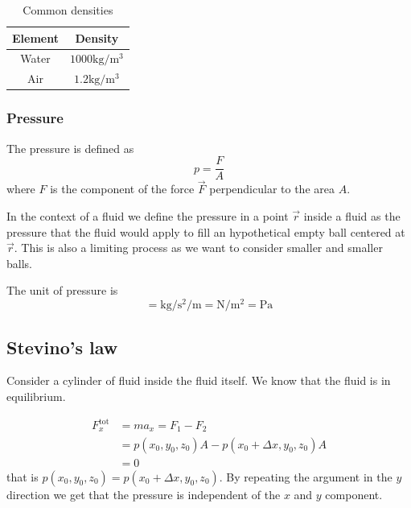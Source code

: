\documentclass[12pt]{extarticle}
\begin{document}
\begin{table}[H]
    \centering
    \begin{tabular}{|c|c|}
        \hline
        \textbf{Element} & \textbf{Density}                         \\
        \hline
        Water            & $1000 \si{\kilogram \per \meter \cubed}$ \\
        Air              & $1.2 \si{\kilogram \per \meter \cubed}$  \\
        \hline
    \end{tabular}
    \caption{Common densities}
\end{table}

\subsubsection{Pressure}

The pressure is defined as
\begin{equation}
    p = \frac{F}{A}
\end{equation}
where $F$ is the component of the force $\vec{F}$ perpendicular to the area $A$.

In the context of a fluid we define the pressure in a point $\vec r$ inside a fluid as the pressure that the fluid would apply to fill an hypothetical empty ball centered at $\vec r$.
This is also a limiting process as we want to consider smaller and smaller balls.

The unit of pressure is
\begin{equation}
    [p] = \si{\kilogram \per \second \squared \per \meter} = \si {\newton \per \meter \squared} = \si{\pascal}
\end{equation}

\subsection{Stevino's law}
\label{sec:stevino}

Consider a cylinder of fluid inside the fluid itself. We know that the fluid is in equilibrium.

\begin{align}
    F_x^{\text{tot}} & = m a_x = F_1 - F_2                                    \\
                     & = p (x_0, y_0, z_0) A - p (x_0 + \Delta x, y_0, z_0) A \\
                     & = 0
\end{align}
that is $p (x_0, y_0, z_0) = p (x_0 + \Delta x, y_0, z_0)$.
By repeating the argument in the $y$ direction we get that the pressure is independent of the $x$ and $y$ component.
\end{document}
